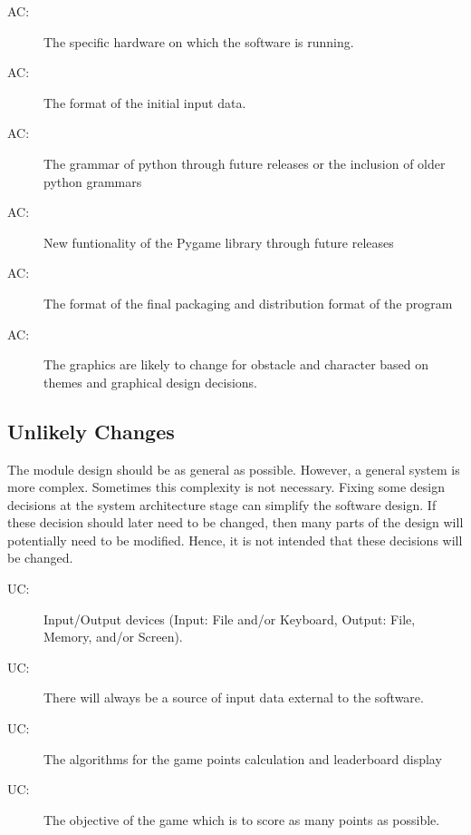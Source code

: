 \documentclass[12pt, titlepage]{article}
\newcounter{acnum}
\newcommand{\actheacnum}{AC\theacnum}
\newcounter{ucnum}
\newcommand{\uctheucnum}{UC\theucnum}
\begin{document}
\begin{description}
\item[ \actheacnum \label{acHardware}:] The specific
  hardware on which the software is running.
\item[ \actheacnum \label{acInput}:] The format of the
  initial input data.
\item[ \actheacnum \label{acInput}:] The grammar of python through future releases or the inclusion of older python grammars
\item[ \actheacnum \label{acInput}:] New funtionality of the Pygame library through future releases 
\item[ \actheacnum \label{acInput}:] The format of the final packaging and distribution format of the program
\item[ \actheacnum \label{acInput}:] The graphics are likely to change for obstacle and character based on themes and graphical design decisions. 
\end{description}

\subsection{Unlikely Changes} \label{SecUchange}

The module design should be as general as possible. However, a general system is
more complex. Sometimes this complexity is not necessary. Fixing some design
decisions at the system architecture stage can simplify the software design. If
these decision should later need to be changed, then many parts of the design
will potentially need to be modified. Hence, it is not intended that these
decisions will be changed.

\begin{description}
\item[ \uctheucnum \label{ucIO}:] Input/Output devices
  (Input: File and/or Keyboard, Output: File, Memory, and/or Screen).
\item[ \uctheucnum \label{ucInput}:] There will always be
  a source of input data external to the software.
\item[ \uctheucnum \label{ucInput}:] The algorithms for the game points calculation and leaderboard display
\item[ \uctheucnum \label{ucInput}:] The objective of the game which is to score as many points as possible. 
\end{description}
\end{document}
